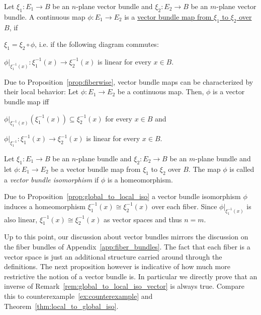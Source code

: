 \begin{definition}
Let $\xi_1:E_1\to B$ be an $n$-plane vector bundle and $\xi_2:E_2\to B$ be an $m$-plane vector bundle. A continuous map $\phi:E_1\to E_2$ is a \ul{vector bundle map from $\xi_1$ to $\xi_2$ over $B$}, if
\begin{i_enum}
\item $\xi_1=\xi_2\circ\phi$, i.e. if the following diagram commutes:
\begin{center}
\end{center}
\item $\phi|_{\xi_1^{-1}(x)}:\xi_1^{-1}(x)\to\xi_2^{-1}(x)$ is linear for every $x\in B$.
\end{i_enum}
\end{definition}
\begin{remark} Due to Proposition~\ref{prop:fiberwise}, vector bundle maps can be characterized by their local behavior: Let $\phi:E_1\to E_2$ be a continuous map. Then, $\phi$ is a vector bundle map iff
\begin{i_enum}
\item $\phi|_{\xi_1^{-1}(x)}(\xi_1^{-1}(x))\subseteq\xi_2^{-1}(x)$ for every $x\in B$ and
\item $\phi|_{\xi_1^{-1}}:\xi_1^{-1}(x)\to\xi_2^{-1}(x)$ is linear for every $x\in B$.
\end{i_enum}
\end{remark}

\begin{definition} Let $\xi_1:E_1\to B$ be an $n$-plane bundle and $\xi_2:E_2\to B$ be an $m$-plane bundle and let $\phi:E_1\to E_2$ be a vector bundle map from $\xi_1$ to $\xi_2$ over $B$. The map $\phi$ is called a \emph{vector bundle isomorphism} if $\phi$ is a homeomorphism.
\end{definition}
\begin{remark}\label{rem:global_to_local_iso_vector} Due to Proposition~\ref{prop:global_to_local_iso} a vector bundle isomorphism $\phi$ induces a homeomorphism $\xi_1^{-1}(x)\cong\xi_2^{-1}(x)$ over each fiber. Since $\phi|_{\xi_1^{-1}(x)}$ is also linear, $\xi_1^{-1}(x)\cong\xi_2^{-1}(x)$ as vector spaces and thus $n=m$.
\end{remark}

Up to this point, our discussion about vector bundles mirrors the discussion on the fiber bundles of Appendix~\ref{app:fiber_bundles}. The fact that each fiber is a vector space is just an additional structure carried around through the definitions. The next proposition however is indicative of how much more restrictive the notion of a vector bundle is. In particular we directly prove that an inverse of Remark~\ref{rem:global_to_local_iso_vector} is always true. Compare this to counterexample~\ref{ex:counterexample} and Theorem~\ref{thm:local_to_global_iso}.

